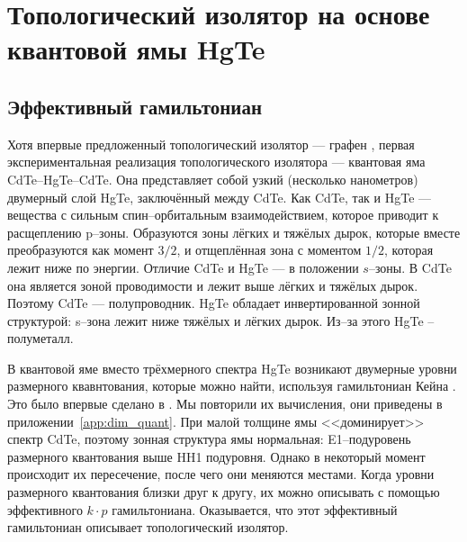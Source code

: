 \section{Топологический изолятор на основе \\квантовой ямы HgTe}
\subsection{Эффективный гамильтониан}
Хотя впервые предложенный топологический изолятор --- графен \cite{Kane2005}, 
первая экспериментальная реализация топологического изолятора ---
квантовая яма CdTe--HgTe--CdTe. Она представляет собой узкий (несколько нанометров)
двумерный слой HgTe, заключённый между CdTe. Как CdTe, так и HgTe --- вещества 
с сильным спин--орбитальным взаимодействием, которое приводит к расщеплению p--зоны.
Образуются зоны лёгких и тяжёлых дырок, которые вместе преобразуются как момент $3/2$,  
и отщеплённая зона с моментом $1/2$, которая лежит ниже по энергии. Отличие CdTe и HgTe ---
в положении $s$--зоны. В CdTe она является зоной проводимости и лежит выше лёгких и тяжёлых
дырок. Поэтому CdTe --- полупроводник. HgTe обладает инвертированной зонной структурой:
s--зона лежит ниже тяжёлых и лёгких дырок. Из--за этого HgTe -- полуметалл. 

В квантовой яме вместо трёхмерного спектра HgTe возникают двумерные 
уровни размерного квавнтования, которые можно найти, используя гамильтониан Кейна 
\cite{Kane1957}. Это 
было впервые сделано в \cite{Bernevig2006}. Мы повторили их вычисления, они приведены в 
приложении~\ref{app:dim_quant}.
При малой толщине ямы <<доминирует>> спектр CdTe, поэтому 
зонная структура ямы нормальная: E1--подуровень размерного квантования выше HH1 подуровня. 
Однако в некоторый момент происходит их пересечение, после чего они меняются местами. Когда 
уровни размерного квантования близки друг к другу, их можно описывать с помощью эффективного
$k\cdot p$ гамильтониана. Оказывается, что этот эффективный гамильтониан описывает
топологический изолятор.

